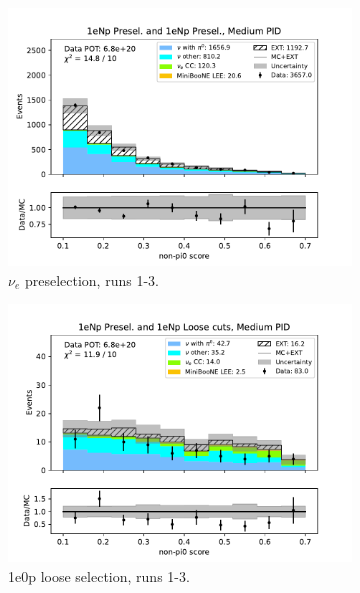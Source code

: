 \begin{figure}[H]
    \centering
    \begin{subfigure}{0.5\linewidth}
        \includegraphics[width=\linewidth]{technote/Sidebands/Figures/NearSideband/near_sideband_nonpi0_score_run123_NP_NP_MEDIUM_PID.pdf}
        \caption{$\nu_e$ preselection, runs 1-3.}
    \end{subfigure}%
    \begin{subfigure}{0.5\linewidth}
        \includegraphics[width=\linewidth]{technote/Sidebands/Figures/NearSideband/near_sideband_nonpi0_score_run123_NP_NPL_MEDIUM_PID.pdf}
        \caption{1e0p loose selection, runs 1-3.}
    \end{subfigure}
    \begin{subfigure}{0.5\linewidth}

\end{subfigure}
\end{figure}
